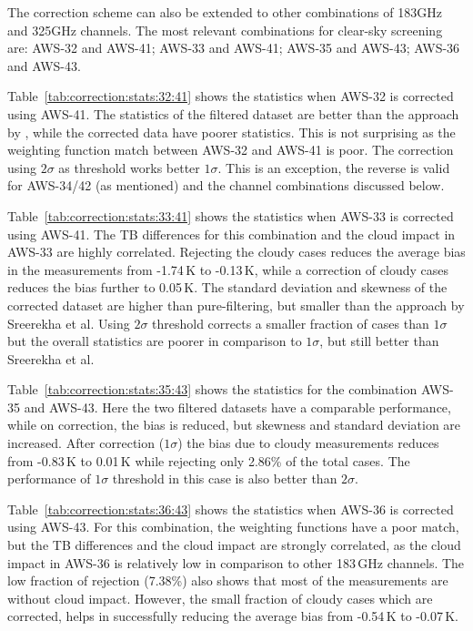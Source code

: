 \documentclass[12pt]{article}
\begin{document}
The correction scheme can also be extended to other combinations of 183GHz and
325GHz channels. The most relevant combinations for clear-sky screening are: AWS-32 and
AWS-41; AWS-33 and AWS-41; AWS-35 and AWS-43; AWS-36 and AWS-43.

Table~\ref{tab:correction:stats:32:41} shows the statistics when AWS-32 is
corrected using AWS-41. The statistics of the filtered dataset are better than
the approach by \cite{rekha2012potential}, while the corrected data have poorer
statistics. This is not surprising as the weighting function match between
AWS-32 and AWS-41 is poor. The correction using $2\sigma$ as threshold works
better $1\sigma$. This is an exception, the reverse is valid for AWS-34/42 (as
mentioned) and the channel combinations discussed below.

Table~\ref{tab:correction:stats:33:41} shows the statistics when AWS-33 is
corrected using AWS-41. The TB differences for this combination and the cloud
impact in AWS-33 are highly correlated. Rejecting the cloudy cases reduces the
average bias in the measurements from -1.74\,K to -0.13\,K, while a correction
of cloudy cases reduces the bias further to 0.05\,K. The standard deviation and
skewness of the corrected dataset are higher than pure-filtering, but smaller
than the approach by Sreerekha et al. Using $2\sigma$ threshold corrects a
smaller fraction of cases than $1\sigma$ but the overall statistics are poorer
in comparison to $1\sigma$, but still better than Sreerekha et al.

Table~\ref{tab:correction:stats:35:43} shows the statistics for the combination AWS-35 and AWS-43. Here the two filtered datasets have a comparable performance, while on correction, the bias is reduced, but skewness and standard deviation are increased. After correction ($1\sigma$) the bias due to cloudy measurements reduces from -0.83\,K to 0.01\,K while rejecting only 2.86\% of the total cases.  The performance of $1\sigma$ threshold in this case is also better than $2\sigma$.  
 
 
Table~\ref{tab:correction:stats:36:43} shows the statistics when AWS-36 is
corrected using AWS-43. For this combination, the weighting functions have a
poor match, but the TB differences and the cloud impact are strongly
correlated, as the cloud impact in AWS-36 is relatively low in comparison to
other 183\,GHz channels. The low fraction of rejection (7.38\%) also shows that
most of the measurements are without cloud impact. However, the small fraction
of cloudy cases which are corrected, helps in successfully reducing the average
bias from -0.54\,K to -0.07\,K.
\end{document}
